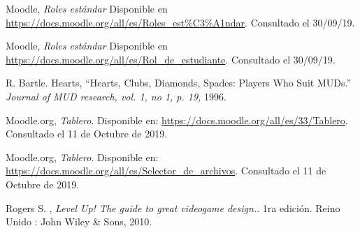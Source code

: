 \begin{thebibliography}{9}
        Moodle, {\it Roles estándar}
        Disponible en \url{https://docs.moodle.org/all/es/Roles_est\%C3\%A1ndar}.
        Consultado el 30/09/19.

        Moodle, {\it Roles estándar}
        Disponible en \url{https://docs.moodle.org/all/es/Rol_de_estudiante}.
        Consultado el 30/09/19.

        R. Bartle. Hearts, 
        ``Hearts, Clubs, Diamonds, Spades: Players Who Suit MUDs.''
        \textit{Journal of MUD research, vol. 1, no 1, p. 19,} 1996.



        Moodle.org, {\it Tablero}.
        Disponible en: \url{https://docs.moodle.org/all/es/33/Tablero}.
        Consultado el 11 de Octubre de 2019.
    
        Moodle.org, {\it Tablero}.
        Disponible en: \url{https://docs.moodle.org/all/es/Selector_de_archivos}.
        Consultado el 11 de Octubre de 2019.








    
        Rogers S. , \textit{Level Up! The guide to great videogame design.}. 1ra edición. Reino Unido : John Wiley \& Sons, 2010. 
        

\end{thebibliography}
